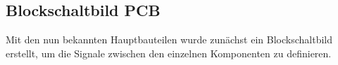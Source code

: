 \subsection{Blockschaltbild PCB}
Mit den nun bekannten Hauptbauteilen wurde zunächst ein Blockschaltbild erstellt, um die Signale zwischen den einzelnen Komponenten zu definieren.